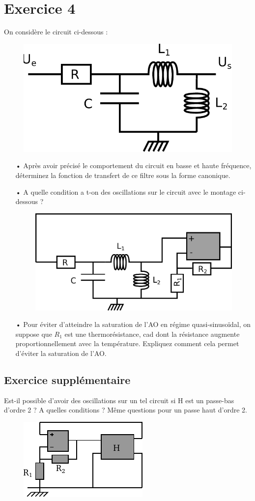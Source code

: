 \documentclass{report}
\begin{document}
\newpage

\section*{Exercice 4}

On considère le circuit ci-dessous :

\begin{figure}[!h]
\centering
\includegraphics[width=0.4\linewidth]{resonnateur.pdf}
\end{figure}

\begin{itemize}
	\item[•]  Après avoir précisé le comportement du circuit en basse et haute fréquence, déterminez la fonction de transfert de ce filtre sous la forme canonique.
	\item[•] A quelle condition a t-on des oscillations sur le circuit avec le montage ci-dessous ?
	
	\begin{figure}[!h]
\centering
\includegraphics[width=0.4\linewidth]{resonnateur2.pdf}
\end{figure}

	\item[•] Pour éviter d'atteindre la saturation de l'AO en régime quasi-sinusoïdal, on suppose que $R_1$ est une thermorésistance, cad dont la résistance augmente proportionnellement avec la température. Expliquez comment cela permet d'éviter la saturation de l'AO.

\end{itemize}




\subsection*{Exercice supplémentaire}
Est-il possible d'avoir des oscillations sur un tel circuit si H est un passe-bas d'ordre 2 ? A quelles conditions ? 
Même questions pour un passe haut d'ordre 2.
\begin{figure}[!h]
\centering
\includegraphics[width=0.3\linewidth]{circuit_9.pdf}
\end{figure}
\end{document}
